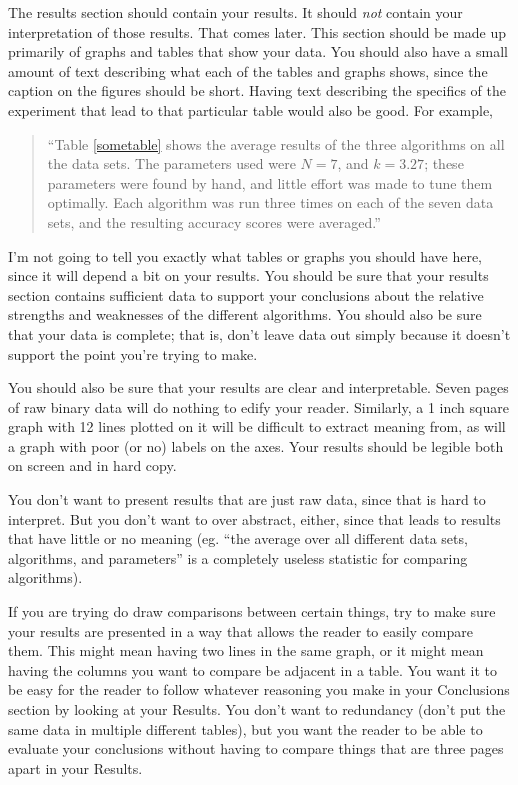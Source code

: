 \documentclass[12pt, letterpaper]{article}
\begin{document}
The results section should contain your results.  It should \emph{not} contain
your interpretation of those results.  That comes later.  This section should be
made up primarily of graphs and tables that show your data.  You should also
have a small amount of text describing what each of the tables and graphs shows,
since the caption on the figures should be short.  Having text describing the
specifics of the experiment that lead to that particular table would also be
good.  For example,

\begin{quote}
``Table \ref{sometable} shows the average results of the three algorithms on all
the data sets.  The parameters used were $N=7$, and $k=3.27$; these parameters
were found by hand, and little effort was made to tune them optimally.  Each
algorithm was run three times on each of the seven data sets, and the resulting
accuracy scores were averaged.''
\end{quote}

I'm not going to tell you exactly what tables or graphs you should have here,
since it will depend a bit on your results.  You should be sure that your
results section contains sufficient data to support your conclusions about the
relative strengths and weaknesses of the different algorithms.  You should also
be sure that your data is complete; that is, don't leave data out simply because
it doesn't support the point you're trying to make.

You should also be sure that your results are clear and interpretable.  Seven
pages of raw binary data will do nothing to edify your reader.  Similarly, a
1 inch square graph with 12 lines plotted on it will be difficult to extract
meaning from, as will a graph with poor (or no) labels on the axes.  Your
results should be legible both on screen and in hard copy.

You don't want to present results that are just raw data, since that is hard to
interpret.  But you don't want to over abstract, either, since that leads to
results that have little or no meaning (eg. ``the average over all different
data sets, algorithms, and parameters'' is a completely useless statistic for
comparing algorithms).

If you are trying do draw comparisons between certain things, try to make sure
your results are presented in a way that allows the reader to easily compare
them.  This might mean having two lines in the same graph, or it might mean
having the columns you want to compare be adjacent in a table.  You want it to
be easy for the reader to follow whatever reasoning you make in your Conclusions
section by looking at your Results.  You don't want to redundancy (don't put the
same data in multiple different tables), but you want the reader to be able to
evaluate your conclusions without having to compare things that are three pages
apart in your Results.
\end{document}
